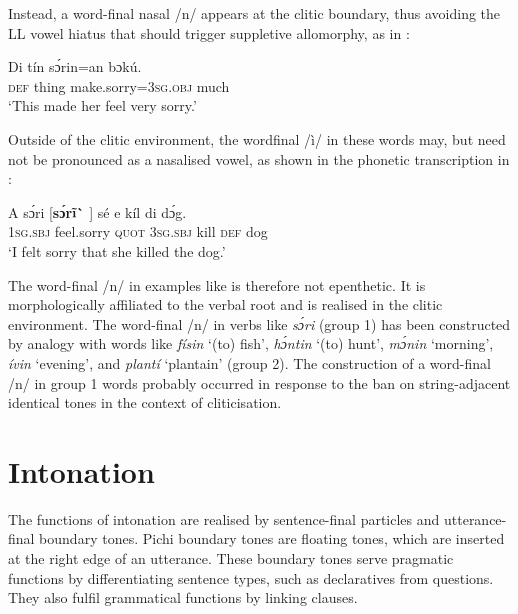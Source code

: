 \z

Instead, a word-final nasal /n/ appears at the clitic boundary, thus avoiding the LL vowel hiatus that should trigger suppletive allomorphy, as in :


\ea%
    \label{ex:key:78}
    \gll   Di  tín    sɔ́rin=an         bɔkú.   \\
\textsc{def}  thing  make.sorry=\textsc{3sg.obj}  much\\

\glt ‘This made her feel very sorry.’
\z

Outside of the clitic environment, the wordfinal /ì/ in these words may, but need not be pronounced as a nasalised vowel, as shown in the phonetic transcription in :


\ea%
    \label{ex:key:79}
    \gll   A    sɔ́ri  [\textbf{sɔ́rĩ\`{} }]  sé    e    kíl  di  dɔ́g.\\
\textsc{1sg.sbj}  feel.sorry  \textsc{quot}    \textsc{3sg.sbj}  kill  \textsc{def}  dog\\

\glt ‘I felt sorry that she killed the dog.’
\z

The word-final /n/ in examples like  is therefore not epenthetic. It is morphologically affiliated to the verbal root and is realised in the clitic environment. The word-final /n/ in verbs like \textit{sɔ́ri} (group 1) has been constructed by analogy with words like \textit{físin} ‘(to) fish’, \textit{hɔ́ntin} ‘(to) hunt’, \textit{mɔ́nin} ‘morning’, \textit{ívin} ‘evening’, and \textit{plantí} ‘plantain’ (group 2). The construction of a word-final /n/ in group 1 words probably occurred in response to the ban on string-adjacent identical tones in the context of cliticisation.

\section{Intonation}\label{sec:3.4}

The functions of intonation are realised by sentence-final particles and utterance-final boundary tones. Pichi boundary tones are floating tones, which are inserted at the right edge of an utterance. These boundary tones serve pragmatic functions by differentiating sentence types, such as declaratives from questions. They also fulfil grammatical functions by linking clauses.


